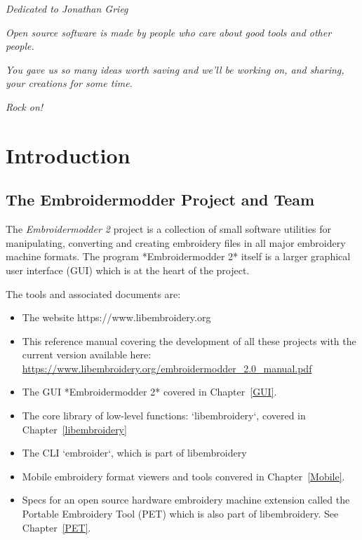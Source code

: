 \documentclass[a4paper]{report}
\begin{document}
\newpage

\vspace*{8cm}

\begin{center}
    \emph{Dedicated to Jonathan Grieg}
    
    \vspace{1cm}
    
    \emph{Open source software is made by people who care about good tools
     and other people.}
    
    \vspace{1cm}
    
    \emph{You gave us so many ideas worth saving and we'll be working on,
    and sharing, your creations for some time.}
    
    \vspace{1cm}
    
    \emph{Rock on!}
\end{center}
    
\newpage

\tableofcontents

\chapter{Introduction}

\section{The Embroidermodder Project and Team}

The \emph{Embroidermodder 2} project is a collection of small software
utilities for manipulating, converting and creating embroidery files in all
major embroidery machine formats. The program *Embroidermodder 2* itself
is a larger graphical user interface (GUI) which is at the heart of the project.

The tools and associated documents are:

\begin{itemize}
\item The website https://www.libembroidery.org
\item This reference manual covering the development of all these projects with
the current version available here:
\url{https://www.libembroidery.org/embroidermodder_2.0_manual.pdf}
\item The GUI *Embroidermodder 2* covered in Chapter~\ref{GUI}.
\item The core library of low-level functions: `libembroidery`, covered in
Chapter~\ref{libembroidery}
\item The CLI `embroider`, which is part of libembroidery
\item Mobile embroidery format viewers and tools convered in Chapter~\ref{Mobile}.
\item Specs for an open source hardware embroidery machine extension called the
Portable Embroidery Tool (PET) which is also part of libembroidery.
See Chapter~\ref{PET}.
\fi
\end{itemize}
\end{document}

